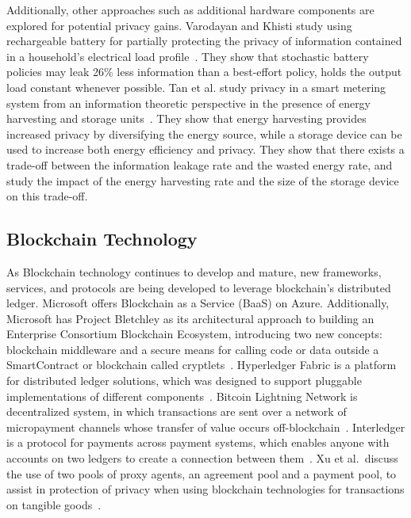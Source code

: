 Additionally, other approaches such as additional hardware components are explored for potential privacy gains. Varodayan and Khisti study using rechargeable battery for partially protecting the privacy of information contained in a household's electrical load profile~\cite{varodayan2011smart}. They show that stochastic battery policies may leak 26\% less information than a best-effort policy, holds the output load constant whenever possible. Tan et al. study privacy in a smart metering system from an information theoretic perspective in the presence of energy harvesting and storage units~\cite{tan2013increasing}. They show that energy harvesting provides increased privacy by diversifying the energy source, while a storage device can be used to increase both energy efficiency and privacy. They show that there exists a trade-off between the information leakage rate and the wasted energy rate, and study the impact of the energy harvesting rate and the size of the storage device on this trade-off.


\subsection{Blockchain Technology}

As Blockchain technology continues to develop and mature, new frameworks, services, and protocols are being developed to leverage blockchain's distributed ledger. Microsoft offers Blockchain as a Service (BaaS) on Azure. Additionally, Microsoft has Project Bletchley as its architectural approach to building an Enterprise Consortium Blockchain Ecosystem, introducing two new concepts: blockchain middleware and a secure means for calling code or data outside a SmartContract or blockchain called cryptlets~\cite{gray2016introducing}. Hyperledger Fabric is a platform for distributed ledger solutions, which was designed to support pluggable implementations of different components~\cite{hyperledger2017fabric}. Bitcoin Lightning Network is decentralized system, in which transactions are sent over a network of micropayment channels whose transfer of value occurs off-blockchain~\cite{poon2016bitcoin}. Interledger is a protocol for payments across payment systems, which enables anyone with accounts on two ledgers to create
a connection between them~\cite{thomas_protocol}. Xu et al.\ discuss the use of two pools of proxy agents, an agreement pool and a payment pool, to assist in protection of privacy when using blockchain technologies for transactions on tangible goods~\cite{Xu2017}.


